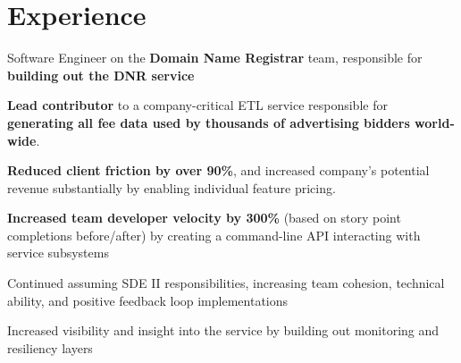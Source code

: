 \documentclass[]{two-column-resume}
\begin{document}
\begin{minipage}[t]{0.65\textwidth} 

\section{Experience}


 \vspace{\topsep} %
 
\begin{tightemize}
\item Software Engineer on the \textbf{Domain Name Registrar} team,
responsible for \textbf{building out the DNR service}
\end{tightemize}
\sectionsep


 \vspace{\topsep} %
 
\begin{tightemize}
\item {\bf Lead contributor} to a company-critical ETL service responsible
for {\bf generating all fee data used by thousands of advertising bidders world-wide}.
\item {\bf Reduced client friction by over 90\%}, and increased
company's potential revenue substantially by enabling individual feature pricing.
\item {\bf Increased team developer velocity by 300\%} (based on story point
completions before/after) by creating a command-line API interacting
with service subsystems
\item Continued assuming SDE II responsibilities, increasing team cohesion,
technical ability, and positive feedback loop implementations
\item Increased visibility and insight into the service by building out monitoring and resiliency layers
\end{tightemize}
\sectionsep


\end{minipage}
\end{document}
